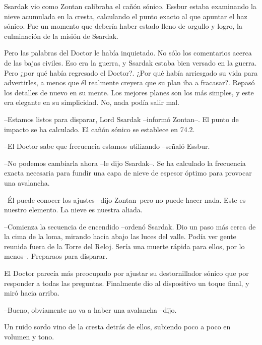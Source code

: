 Ssardak vio como Zontan calibraba el cañón sónico. Essbur estaba examinando la nieve acumulada en la cresta, calculando el punto exacto al que apuntar el haz sónico. Fue un momento que debería haber estado lleno de orgullo y logro, la culminación de la misión de Ssardak.



Pero las palabras del Doctor le había inquietado. No sólo los comentarios acerca de las bajas civiles. Eso era la guerra, y Ssardak estaba bien versado en la guerra. Pero ¿por qué había regresado el Doctor?. ¿Por qué había arriesgado su vida para advertirles, a menos que él realmente creyera que su plan iba a fracasar?. Repasó los detalles de nuevo en su mente. Los mejores planes son los más simples, y este era elegante en su simplicidad. No, nada podía salir mal.



--Estamos listos para disparar, Lord Ssardak --informó Zontan--. El punto de impacto se ha calculado. El cañón sónico se establece en 74.2.



--El Doctor sabe que frecuencia estamos utilizando --señaló Essbur.



--No podemos cambiarla ahora --le dijo Ssardak--. Se ha calculado la frecuencia exacta necesaria para fundir una capa de nieve de espesor óptimo para provocar una avalancha.



--Él puede conocer los ajustes --dijo Zontan--pero no puede hacer nada. Este es nuestro elemento. La nieve es nuestra aliada. 



--Comienza la secuencia de encendido --ordenó Ssardak. Dio un paso más cerca de la cima de la loma, mirando hacia abajo las luces del valle. Podía ver gente reunida fuera de la Torre del Reloj. Sería una muerte rápida para ellos, por lo menos--. Preparaos para disparar.



\mbox{}



El Doctor parecía más preocupado por ajustar su destornillador sónico que por responder a todas las preguntas. Finalmente dio al dispositivo un toque final, y miró hacia arriba.



--Bueno, obviamente no va a haber una avalancha --dijo.



Un ruido sordo vino de la cresta detrás de ellos, subiendo poco a poco en volumen y tono.



